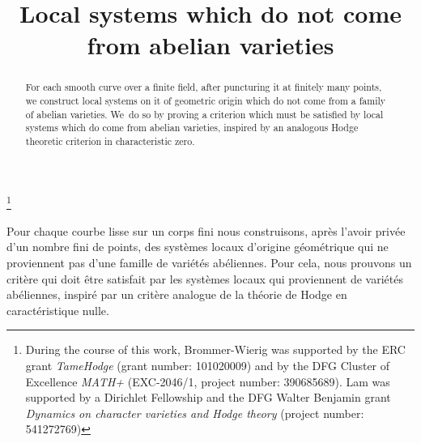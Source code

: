 \documentclass[JEP,XML,SOM,Unicode,published]{cedram}
\numberwithin{equation}{subsection}
\theoremstyle{definition}
\begin{document}
\frontmatter
\title{Local systems which do not come from abelian varieties}

\author[\initial{P.} \lastname{Brommer-Wierig}]{ }
\address{Humboldt-Universität zu Berlin, Institut für Mathematik,\\
Rudower Chaussee 25, 12489 Berlin, Germany}

\author[\initial{Y. H. J.} \lastname{Lam}]{ }
\address{Humboldt-Universität zu Berlin, Institut für Mathematik,\\
Rudower Chaussee 25, 12489 Berlin, Germany}

\thanks{During the course of this work, Brommer-Wierig was supported by the ERC grant \emph{TameHodge} (grant number: 101020009) and by the DFG Cluster of Excellence \emph{MATH+} (EXC-2046/1, project number: 390685689). Lam was supported by a Dirichlet Fellowship and the DFG Walter Benjamin grant \emph{Dynamics on character varieties and Hodge theory} (project number: 541272769)}

\begin{abstract}
For each smooth curve over a finite field, after puncturing it at finitely many points, we construct local systems on it of geometric origin which do not come from a family of abelian varieties. We~do so by proving a criterion which must be satisfied by local systems which do come from abelian varieties, inspired by an analogous Hodge theoretic criterion in characteristic zero.
\end{abstract}





\begin{altabstract}
Pour chaque courbe lisse sur un corps fini nous construisons, après l'avoir privée d'un nombre fini de points, des systèmes locaux d'origine géométrique qui ne proviennent pas d'une famille de variétés abéliennes. Pour cela, nous prouvons un critère qui doit être satisfait par les systèmes locaux qui proviennent de variétés abéliennes, inspiré par un critère analogue de la théorie de Hodge en caractéristique nulle.
\end{altabstract}
\end{document}
